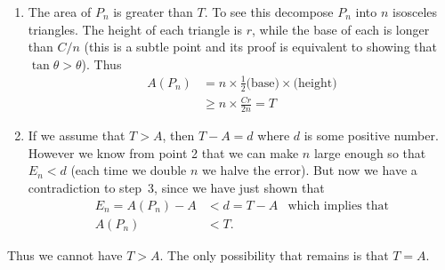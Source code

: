 \begin{enumerate}
\item The area of $P_n$ is greater than $T$. To see this decompose $P_n$ into $n$
isosceles triangles. The height of each triangle is $r$, while the base of each is longer
than $C/n$ (this is a subtle point and its proof is equivalent to showing that $\tan
\theta > \theta$). Thus
\begin{align*}
  A(P_n) &= n \times \frac{1}{2} \text{(base)}\times \text{(height)} \\
  & \geq n \times \frac{Cr}{2n} = T
\end{align*}

\item If we assume that $T>A$, then $T-A = d$ where $d$ is some positive number.
However we know from point 2 that we can make $n$ large enough so that $E_n < d$ (each
time we double $n$ we halve the error). But now we have a contradiction to step~3, since we have just
shown that
\begin{align*}
  E_n = A(P_n) - A & < d = T-A & \text{which implies that}\\
  A(P_n) & < T.
\end{align*}
\end{enumerate}
Thus we cannot have $T>A$. The only possibility that remains is that $T=A$.


